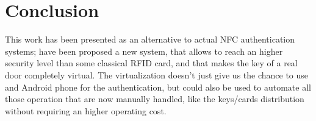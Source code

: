 \documentclass[conference]{IEEEtran}
\begin{document}
\section{Conclusion}

This work has been presented as an alternative to actual NFC authentication systems; have been proposed a new system, that allows to reach an higher security level than some classical RFID card, and that makes the key of a real door completely virtual. The virtualization doesn’t just give us the chance to use and Android phone for the authentication, but could also be used to automate all those operation that are now manually handled, like the keys/cards distribution without requiring an higher operating cost.











%
%
%




\end{document}
